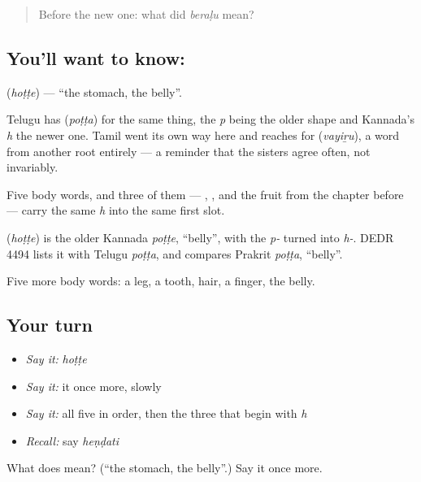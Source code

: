 \begin{quote}
Before the new one: what did \emph{beraḷu} mean?
\end{quote}

\subsection*{You'll want to know: }
\textbf{} (\emph{hoṭṭe}) — \textquotedblleft{}the stomach, the belly\textquotedblright{}.

Telugu has  (\emph{poṭṭa}) for the same thing, the \emph{p} being the older shape and Kannada's \emph{h} the newer one. Tamil went its own way here and reaches for  (\emph{vayiṟu}), a word from another root entirely — a reminder that the sisters agree often, not invariably.

Five body words, and three of them — , , and the fruit from the chapter before — carry the same \emph{h} into the same first slot.

\begin{cousinweb}
\textbf{} (\emph{hoṭṭe}) is the older Kannada \emph{poṭṭe}, \textquotedblleft{}belly\textquotedblright{}, with the \emph{p-} turned into \emph{h-}. DEDR 4494 lists it with Telugu \emph{poṭṭa}, and compares Prakrit \emph{poṭṭa}, \textquotedblleft{}belly\textquotedblright{}.
\end{cousinweb}

\begin{grammarlens}[title={What you've built}]
Five more body words: a leg, a tooth, hair, a finger, the belly.
\end{grammarlens}

\subsection*{Your turn}
\begin{itemize}
\raggedright
  \item \emph{Say it:} \emph{hoṭṭe}
  \item \emph{Say it:} it once more, slowly
  \item \emph{Say it:} all five in order, then the three that begin with \emph{h}
  \item \emph{Recall:} say \emph{heṇḍati}
\end{itemize}

\begin{tcolorbox}[breakable,colback=teal!4,colframe=teal!35!black,title={Before you move on}]
What does  mean? (\textquotedblleft{}the stomach, the belly\textquotedblright{}.) Say it once more.
\end{tcolorbox}
